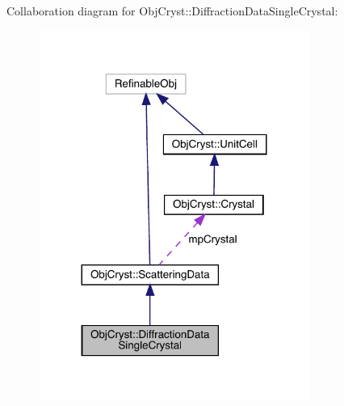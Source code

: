 Collaboration diagram for Obj\+Cryst\+::Diffraction\+Data\+Single\+Crystal\+:
\nopagebreak
\begin{figure}[H]
\begin{center}
\leavevmode
\includegraphics[width=251pt]{class_obj_cryst_1_1_diffraction_data_single_crystal__coll__graph}
\end{center}
\end{figure}
